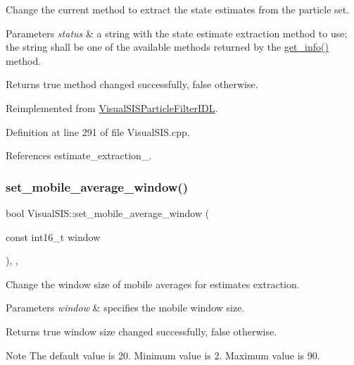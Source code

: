 Change the current method to extract the state estimates from the particle set. 


\begin{DoxyParams}{Parameters}
{\em status} & a string with the state estimate extraction method to use; the string shall be one of the available methods returned by the \hyperlink{classVisualSIS_af1ecb78ecc8c9838c05b7d29c5a9f83a}{get\+\_\+info()} method. \\
\hline
\end{DoxyParams}
\begin{DoxyReturn}{Returns}
true method changed successfully, false otherwise. 
\end{DoxyReturn}


Reimplemented from \hyperlink{classVisualSISParticleFilterIDL_ac5f296082bd83e1ee1b74e9af16e856a}{Visual\+S\+I\+S\+Particle\+Filter\+I\+DL}.



Definition at line 291 of file Visual\+S\+I\+S.\+cpp.



References estimate\+\_\+extraction\+\_\+.

\mbox{\label{classVisualSIS_a08aa7928cccabd93a1907cb540863cda}} 
\subsubsection{\texorpdfstring{set\+\_\+mobile\+\_\+average\+\_\+window()}{set\_mobile\_average\_window()}}
{\footnotesize\ttfamily bool Visual\+S\+I\+S\+::set\+\_\+mobile\+\_\+average\+\_\+window (\begin{DoxyParamCaption}\item[{const int16\+\_\+t}]{window }\end{DoxyParamCaption})\hspace{0.3cm}{\ttfamily [override]}, {\ttfamily [protected]}, {\ttfamily [virtual]}}



Change the window size of mobile averages for estimates extraction. 


\begin{DoxyParams}{Parameters}
{\em window} & specifies the mobile window size. \\
\hline
\end{DoxyParams}
\begin{DoxyReturn}{Returns}
true window size changed successfully, false otherwise. 
\end{DoxyReturn}
\begin{DoxyNote}{Note}
The default value is 20. Minimum value is 2. Maximum value is 90. 
\end{DoxyNote}



